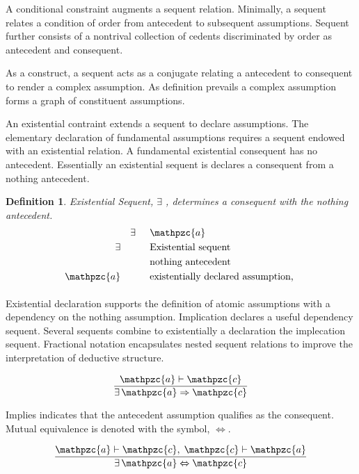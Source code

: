 \documentclass[aps,twocolumn,secnumarabic,nobalancelastpage,amsmath,amssymb,
amsthm,nofootinbib,parskip=full]{revtex4}
\numberwithin{equation}{section}
\newtheorem{definition}{Definition}[section]
\newcommand{\obk}[1]{\mathpzc{#1}}
\begin{document}
A conditional constraint augments a sequent relation.
Minimally, a sequent relates a condition of order 
from antecedent to subsequent assumptions.
Sequent further consists of a nontrival collection of cedents
discriminated by order as antecedent and consequent.

As a construct, a sequent acts as a conjugate relating
a antecedent to consequent to render a complex assumption.
As definition prevails a complex assumption forms a graph of
constituent assumptions.

An existential contraint extends a sequent to declare assumptions.
The elementary declaration of fundamental assumptions requires a
sequent endowed with an existential relation.
A fundamental existential consequent has no antecedent.
Essentially an existential sequent is declares a
consequent from a nothing antecedent.

\begin{definition}{Existential Sequent, $\exists$}
  \label{def:existentialdeclare},
  determines a consequent with the nothing antecedent.
  \begin{equation*}
  \begin{array}{rll}
   &\exists&\obk{a} \\[3pt]
   \exists&\quad&\text{Existential sequent}\\[3pt]
   &\quad&\text{nothing antecedent} \\[3pt]
   \obk{a}&\quad&\text{existentially declared assumption, } \\[3pt]
  \end{array}
  \end{equation*}
\end{definition}

Existential declaration supports the definition of atomic assumptions
with a dependency on the nothing assumption.
Implication declares a useful dependency sequent.
Several sequents combine to existentially a declaration the
implecation sequent.
Fractional notation encapsulates nested sequent relations to
improve the interpretation of deductive structure.

\begin{equation*}
\frac{\obk{a}\vdash\obk{c}}
{\exists\,\obk{a}\Rightarrow\obk{c}}
\end{equation*}  

Implies indicates that the antecedent assumption qualifies as the
consequent. Mutual equivalence is denoted with the symbol, $\Leftrightarrow$.

\begin{equation*}
\frac{\obk{a}\vdash\obk{c},\;\obk{c}\vdash\obk{a}}
{\exists\,\obk{a}\Leftrightarrow\obk{c}}
\end{equation*}  
\end{document}
